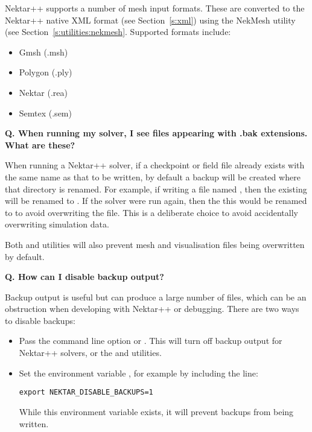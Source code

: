 Nektar++ supports a number of mesh input formats. These are converted to the
Nektar++ native XML format (see Section~\ref{s:xml}) using the NekMesh utility
(see Section~\ref{s:utilities:nekmesh}. Supported formats include:
\begin{itemize}
\item Gmsh (.msh)
\item Polygon (.ply)
\item Nektar (.rea)
\item Semtex (.sem)
\end{itemize}

\textbf{Q. When running my solver, I see files appearing with {\inltt .bak}
  extensions. What are these?}

When running a Nektar++ solver, if a checkpoint or field file already exists
with the same name as that to be written, by default a backup will be created
where that directory is renamed. For example, if writing a file named
, then the existing  will be renamed to
. If the solver were run again, then the
 this would be renamed to  to avoid
overwriting the  file. This is a deliberate choice to
avoid accidentally overwriting simulation data.

Both  and  utilities will also prevent mesh
and visualisation files being overwritten by default.

\textbf{Q. How can I disable backup output?}

Backup output is useful but can produce a large number of files, which can be an
obstruction when developing with Nektar++ or debugging. There are two ways to
disable backups:

\begin{itemize}
  \item Pass the command line option  or . This
    will turn off backup output for Nektar++ solvers, or the  and
     utilities.
  \item Set the environment variable , for
    example by including the line:
    \begin{lstlisting}[style=BashInputStyle]
      export NEKTAR_DISABLE_BACKUPS=1
    \end{lstlisting}
    While this environment variable exists, it will prevent backups from being
    written.
\end{itemize}
